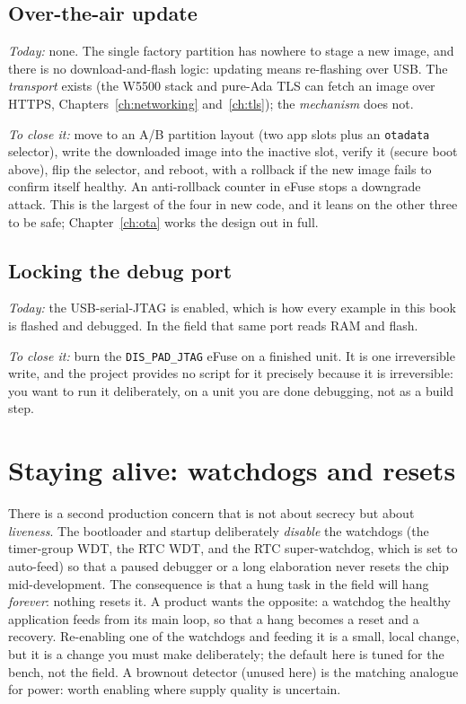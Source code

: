 \subsection{Over-the-air update}\label{prod:ota}

\emph{Today:} none. The single factory partition has nowhere to stage a new image,
and there is no download-and-flash logic: updating means re-flashing over USB.
The \emph{transport} exists (the W5500 stack and pure-Ada TLS can fetch an image
over HTTPS, Chapters~\ref{ch:networking} and~\ref{ch:tls}); the \emph{mechanism}
does not.

\emph{To close it:} move to an A/B partition layout (two app slots plus an
\texttt{otadata} selector), write the downloaded image into the inactive slot,
verify it (secure boot above), flip the selector, and reboot, with a rollback if
the new image fails to confirm itself healthy. An anti-rollback counter in eFuse
stops a downgrade attack. This is the largest of the four in new code, and it leans
on the other three to be safe; Chapter~\ref{ch:ota} works the design out in full.

\subsection{Locking the debug port}

\emph{Today:} the USB-serial-JTAG is enabled, which is how every example in this
book is flashed and debugged. In the field that same port reads RAM and flash.

\emph{To close it:} burn the \texttt{DIS\_PAD\_JTAG} eFuse on a finished unit. It is
one irreversible write, and the project provides no script for it precisely because
it is irreversible: you want to run it deliberately, on a unit you are done
debugging, not as a build step.

\section{Staying alive: watchdogs and resets}

There is a second production concern that is not about secrecy but about
\emph{liveness}. The bootloader and startup deliberately \emph{disable} the
watchdogs (the timer-group WDT, the RTC WDT, and the RTC super-watchdog, which is
set to auto-feed) so that a paused debugger or a long elaboration never resets the
chip mid-development. The consequence is that a hung task in the field will hang
\emph{forever}: nothing resets it. A product wants the opposite: a watchdog the
healthy application feeds from its main loop, so that a hang becomes a reset and a
recovery. Re-enabling one of the watchdogs and feeding it is a small, local change,
but it is a change you must make deliberately; the default here is tuned for the
bench, not the field. A brownout detector (unused here) is the matching
analogue for power: worth enabling where supply quality is uncertain.

